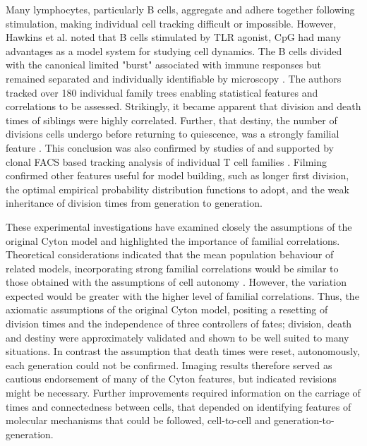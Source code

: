 \documentclass[11pt, a4paper]{article}
\begin{document}
Many lymphocytes, particularly B cells, aggregate and adhere together following stimulation, making individual cell tracking difficult or impossible. However, Hawkins et al. noted that B cells stimulated by TLR agonist, CpG had many advantages as a model system for studying cell dynamics. The B cells divided with the canonical limited "burst" associated with immune responses but remained separated and individually identifiable by microscopy \parencite{Hawkins.2009}. The authors tracked over 180 individual family trees enabling statistical features and correlations to be assessed. Strikingly, it became apparent that division and death times of siblings were highly correlated. Further, that destiny, the number of divisions cells undergo before returning to quiescence, was a strongly familial feature \parencite{Hawkins.2009}. This conclusion was also confirmed by studies of \cite{Markham.2010, Wellard.2010, Duffy.2012, Dowling.2014, Shokhirev.2015, Mitchell.2018} and supported by clonal FACS based tracking analysis of individual T cell families \parencite{Marchingo.2016, Horton.2018}. Filming confirmed other features useful for model building, such as longer first division, the optimal empirical probability distribution functions to adopt, and the weak inheritance of division times from generation to generation.

These experimental investigations have examined closely the assumptions of the original Cyton model and highlighted the importance of familial correlations. Theoretical considerations indicated that the mean population behaviour of related models, incorporating strong familial correlations would be similar to those obtained with the assumptions of cell autonomy \parencite{Duffy.2008, Wellard.2010, Duffy.2012}. However, the variation expected would be greater with the higher level of familial correlations. Thus, the axiomatic assumptions of the original Cyton model, positing a resetting of division times and the independence of three controllers of fates; division, death and destiny were approximately validated and shown to be well suited to many situations. In contrast the assumption that death times were reset, autonomously, each generation could not be confirmed. Imaging results therefore served as cautious endorsement of many of the Cyton features, but indicated revisions might be necessary. Further improvements required information on the carriage of times and connectedness between cells, that depended on identifying features of molecular mechanisms that could be followed, cell-to-cell and generation-to-generation.
\end{document}
